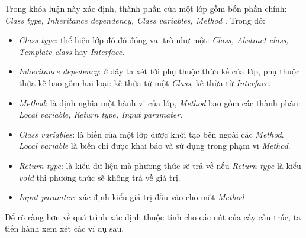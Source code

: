 \documentclass[12pt]{report}
\begin{document}
\noindent Trong khóa luận này xác định, thành phần của một lớp gồm bốn phần chính: \textit{Class type, Inheritance dependency, Class variables, Method }. Trong đó:
\vspace{-0.1cm}
\begin{itemize}
	\item \textit{Class type}: thể hiện lớp đó đó đóng vai trò như một:\textit{ Class, Abstract class, Template class} hay \textit{Interface}.
	\item \textit{Inheritance depedency}: ở đây  ta xét tới phụ thuộc thừa kế của lớp, phụ thuộc thừa kế bao gồm hai loại: kế thừa từ một \textit{Class}, kế thừa từ \textit{Interface}.
	\item \textit{Method}: là định nghĩa một hành vi của lớp, \textit{Method} bao gồm các thành phần: \textit{Local variable, Return type, Input paramater}.
	\item  \textit{Class variables}: là biến của một lớp được khởi tạo bên ngoài các \textit{Method}. \textit{Local variable} là biến chỉ được khai báo và sử dụng trong phạm vi \textit{Method}.  
	\item \textit{Return type}: là kiểu dữ liệu mà phương thức sẽ trả về nếu \textit{Return type} là kiểu \textit{void} thì phương thức sẽ không trả về giá trị.
	\item \textit{Input paramter}: xác định kiểu giá trị đầu vào cho một \textit{Method}
\end{itemize}
Để rõ ràng hơn về quá trình xác định thuộc tính cho các nút của cây cấu trúc, ta tiến hành xem xét các ví dụ sau.
\end{document}

